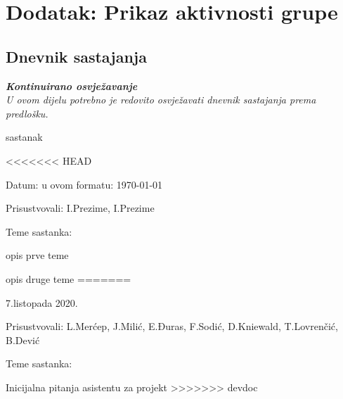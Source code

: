 \chapter*{Dodatak: Prikaz aktivnosti grupe}
		
		\section*{Dnevnik sastajanja}
		
		\textbf{\textit{Kontinuirano osvježavanje}}\\
		
		 \textit{U ovom dijelu potrebno je redovito osvježavati dnevnik sastajanja prema predlošku.}
		
		\begin{packed_enum}
			\item  sastanak
			
			\item[] \begin{packed_item}
<<<<<<< HEAD
				\item Datum: u ovom formatu: \today
				\item Prisustvovali: I.Prezime, I.Prezime
				\item Teme sastanka:
				\begin{packed_item}
					\item  opis prve teme
					\item  opis druge teme
=======
				\item 7.listopada 2020.
				\item Prisustvovali: L.Merćep, J.Milić, E.Đuras, F.Sodić, D.Kniewald, T.Lovrenčić, B.Dević
				\item Teme sastanka:
				\begin{packed_item}
					\item  Inicijalna pitanja asistentu za projekt
>>>>>>> devdoc
				\end{packed_item}
			\end{packed_item}
			

\end{packed_item}
\end{packed_enum}
